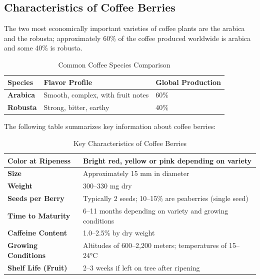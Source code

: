 \subsection{Characteristics of Coffee Berries}

The two most economically important varieties of coffee plants are the arabica
and the robusta; approximately 60\% of the coffee produced worldwide is arabica
and some 40\% is robusta.

\begin{table}
    \centering
    \caption{Common Coffee Species Comparison}
    \medskip
    \label{tab:coffee_species}
    \renewcommand{\arraystretch}{1.5}
    \begin{tabular}{|>{\bfseries}l|l|l|}
        \hline
        Species & \textbf{Flavor Profile} & \textbf{Global Production} \\
        \hline
        Arabica & Smooth, complex, with fruit notes & 60\% \\
        \hline
        Robusta & Strong, bitter, earthy & 40\% \\
        \hline
    \end{tabular}
\end{table}
\pagebreak

The following table summarizes key information about coffee berries:

\begin{table}
    \centering
    \caption{Key Characteristics of Coffee Berries}
    \medskip
    \label{tab:coffee_characteristics}
    \renewcommand{\arraystretch}{1.5}
    \begin{tabular}{|>{\bfseries}p{2in}|p{4in}|}
        \hline
        Color at Ripeness & Bright red, yellow or pink depending on variety \\
        \hline
        Size & Approximately 15 mm in diameter \\
        \hline
        Weight & 300--330 mg dry \\
        \hline
        Seeds per Berry & Typically 2 seeds; 10--15\% are peaberries (single seed) \\
        \hline
        Time to Maturity & 6--11 months depending on variety and growing conditions \\
        \hline
        Caffeine Content & 1.0--2.5\% by dry weight \\
        \hline
        Growing Conditions & Altitudes of 600--2,200 meters; temperatures of 15--24°C \\
        \hline
        Shelf Life (Fruit) & 2--3 weeks if left on tree after ripening \\
        \hline
    \end{tabular}
\end{table}

